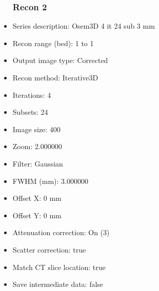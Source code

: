 \documentclass[12pt]{article}
\begin{document}
\begin{itemize}
\subsubsection{Recon 2}
\item Series description: Osem3D 4 it 24 sub 3 mm
\item Recon range (bed): 1 to 1
\item Output image type: Corrected
\item Recon method: Iterative3D
\item Iterations: 4
\item Subsets: 24
\item Image size: 400
\item Zoom: 2.000000
\item Filter: Gaussian
\item FWHM (mm): 3.000000
\item Offset X: 0 mm
\item Offset Y: 0 mm
\item Attenuation correction: On (3)
\item Scatter correction: true
\item Match CT slice location: true
\item Save intermediate data: false
\end{itemize}
\end{document}
